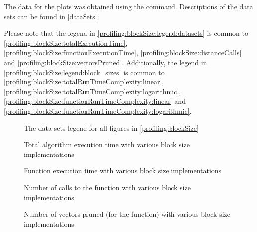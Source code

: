 The data for the plots was obtained using the 
 command. Descriptions of the data sets can be found in
\autoref{dataSets}.

Please note that the legend in \autoref{profiling:blockSize:legend:datasets} is
common to \autoref{profiling:blockSize:totalExecutionTime},
\autoref{profiling:blockSize:functionExecutionTime},
\autoref{profiling:blockSize:distanceCalls} and
\autoref{profiling:blockSize:vectorsPruned}. Additionally, the legend in
\autoref{profiling:blockSize:legend:block_sizes} is common to
\autoref{profiling:blockSize:totalRunTimeComplexity:linear},
\autoref{profiling:blockSize:totalRunTimeComplexity:logarithmic},
\autoref{profiling:blockSize:functionRunTimeComplexity:linear} and
\autoref{profiling:blockSize:functionRunTimeComplexity:logarithmic}.

\begin{figure}
    \centering
    
    \caption[Block size profiling legend]{The data sets legend for all figures
        in \autoref{profiling:blockSize}}
    \label{profiling:blockSize:legend:datasets}
\end{figure}

\begin{figure}
    \centering
    
    \caption{Total algorithm execution time with various block size
        implementations}
    \label{profiling:blockSize:totalExecutionTime}
\end{figure}

\begin{figure}
    \centering
    
    \caption{Function execution time with various block size implementations}
    \label{profiling:blockSize:functionExecutionTime}
\end{figure}

\begin{figure}
    \centering
    
    \caption{Number of calls to the  function with various
        block size implementations}
    \label{profiling:blockSize:distanceCalls}
\end{figure}

\begin{figure}
    \centering
    
    \caption[Number of vectors pruned with various block size implementations]{
        Number of vectors pruned (for the 
        function) with various block size implementations}
    \label{profiling:blockSize:vectorsPruned}
\end{figure}


